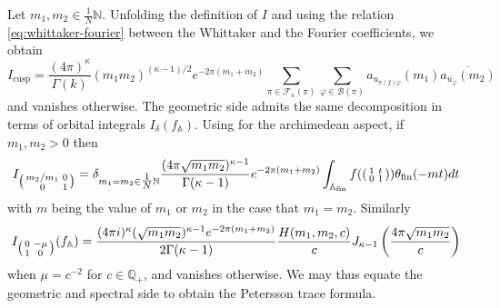 \documentclass{article}
\numberwithin{equation}{section}
\begin{document}
Let $m_1,m_2 \in \tfrac{1}{N}\mathbb{N}$. Unfolding the definition of $I$ and using the relation \eqref{eq:whittaker-fourier} between the Whittaker and the Fourier coefficients, we obtain
\begin{equation}
    I_\text{cusp}=\frac{(4\pi)^\kappa}{\Gamma(k)}(m_1m_2)^{(\kappa-1)/2}e^{-2\pi(m_1+m_2)}\sum_{\pi \in \mathcal{F}_\kappa(\pi)}\sum_{\varphi \in \mathcal{B}(\pi)}a_{u_{\pi(f)\varphi}}(m_1)\overline{{a_{u_\varphi}(m_2)}}
\end{equation}
and vanishes otherwise. The geometric side admits the same decomposition in terms of orbital integrals $I_\delta(f_\mathbb{A})$. Using \cite[Propositions 3.4 and 3.6]{KL-petersson} for the archimedean aspect, if $m_1, m_2>0$ then
\begin{equation*}
    I_{\begin{psmallmatrix}
        m_2/m_1 & 0 \\ 0 & 1
    \end{psmallmatrix}}=\delta_{m_1=m_2 \in \tfrac{1}{N}\mathbb{N} }\frac{(4\pi \sqrt{m_1 m_2})^{\kappa-1}}{\Gamma(\kappa-1)} e^{-2\pi(m_1+m_2)}\int_{\mathbb{A}_\text{fin}}f(\begin{psmallmatrix}
        1 & t \\ 0 & 1
    \end{psmallmatrix})\theta_{\text{fin}}(-mt)dt
\end{equation*}
with  $m$ being the value of $m_1$ or $m_2$ in the case that $m_1=m_2$. Similarly
\begin{equation*}
    I_{\begin{psmallmatrix}
        0 & -\mu \\ 1 & 0
    \end{psmallmatrix}}(f_\mathbb{A})=\frac{(4\pi i)^{\kappa}(\sqrt{m_1 m_2})^{\kappa-1}e^{-2\pi(m_1+m_2)}}{2\Gamma(\kappa-1)}\frac{H(m_1,m_2,c)}{c} J_{\kappa-1}\left( \frac{4\pi\sqrt{m_1m_2}}{c} \right)
\end{equation*}
when $\mu = c^{-2}$ for $c \in \mathbb{Q}_+$, and vanishes otherwise. We may thus equate the geometric and spectral side to obtain the Petersson trace formula.
\end{document}
